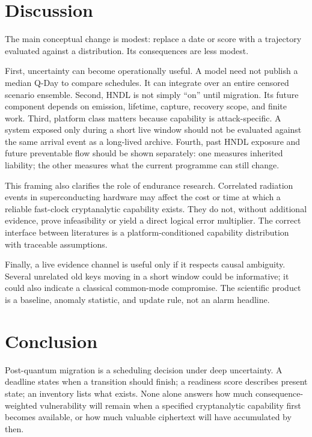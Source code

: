 \documentclass[10pt]{article}
\begin{document}
\section{Discussion}

The main conceptual change is modest: replace a date or score with a trajectory evaluated against a distribution. Its consequences are less modest.

First, uncertainty can become operationally useful. A model need not publish a median Q-Day to compare schedules. It can integrate over an entire censored scenario ensemble. Second, HNDL is not simply ``on'' until migration. Its future component depends on emission, lifetime, capture, recovery scope, and finite work. Third, platform class matters because capability is attack-specific. A system exposed only during a short live window should not be evaluated against the same arrival event as a long-lived archive. Fourth, past HNDL exposure and future preventable flow should be shown separately: one measures inherited liability; the other measures what the current programme can still change.

This framing also clarifies the role of endurance research. Correlated radiation events in superconducting hardware may affect the cost or time at which a reliable fast-clock cryptanalytic capability exists. They do not, without additional evidence, prove infeasibility or yield a direct logical error multiplier. The correct interface between literatures is a platform-conditioned capability distribution with traceable assumptions.

Finally, a live evidence channel is useful only if it respects causal ambiguity. Several unrelated old keys moving in a short window could be informative; it could also indicate a classical common-mode compromise. The scientific product is a baseline, anomaly statistic, and update rule, not an alarm headline.

\section{Conclusion}

Post-quantum migration is a scheduling decision under deep uncertainty. A deadline states when a transition should finish; a readiness score describes present state; an inventory lists what exists. None alone answers how much consequence-weighted vulnerability will remain when a specified cryptanalytic capability first becomes available, or how much valuable ciphertext will have accumulated by then.
\end{document}
